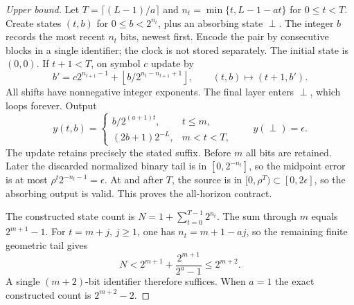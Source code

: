 \begin{proof}[Upper bound]
Let $T=\lceil(L-1)/a\rceil$ and
$n_t=\min\{t,L-1-at\}$ for $0\le t<T$.
Create states $(t,b)$ for $0\le b<2^{n_t}$, plus an absorbing state
$\perp$. The integer $b$ records the most recent $n_t$ bits, newest
first. Encode the pair by consecutive blocks in a single identifier;
the clock is not stored separately. The initial state is $(0,0)$.
If $t+1<T$, on symbol $c$ update by
\[
 b'=c2^{n_{t+1}-1}
       +\left\lfloor b/2^{n_t-n_{t+1}+1}\right\rfloor,
 \qquad(t,b)\mapsto(t+1,b').
\]
All shifts have nonnegative integer exponents. The final layer enters
$\perp$, which loops forever. Output
\[
 y(t,b)=\begin{cases}b/2^{(a+1)t},&t\le m,\\
                      (2b+1)2^{-L},&m<t<T,
        \end{cases}\qquad y(\perp)=\epsilon.
\]
The update retains precisely the stated suffix. Before $m$ all bits are
retained. Later the discarded normalized binary tail is in
$[0,2^{-n_t}]$, so the midpoint error is at most
$\rho^t2^{-n_t-1}=\epsilon$. At and after $T$, the source is in
$[0,\rho^T)\subset[0,2\epsilon]$, so the absorbing output is valid.
This proves the all-horizon contract.

The constructed state count is $N=1+\sum_{t=0}^{T-1}2^{n_t}$.
The sum through $m$ equals $2^{m+1}-1$. For $t=m+j$, $j\ge1$,
one has $n_t=m+1-aj$, so the remaining finite geometric tail gives
\[
 N<2^{m+1}+\frac{2^{m+1}}{2^a-1}\le2^{m+2}.
\]
A single $(m+2)$-bit identifier therefore suffices. When $a=1$ the
exact constructed count is $2^{m+2}-2$.
\end{proof}
